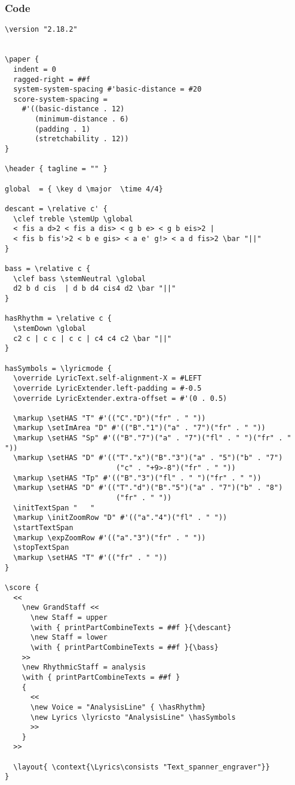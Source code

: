 \documentclass[
  DIV=calc,
  BCOR=5mm,
  12pt,
  headings=small,
  oneside,
  abstract=true,
  toc=bib,
  xcolor=dvipsnames,
  openany,
  ngerman,english]{scrartcl}
\begin{document}
\subsubsection{Code}
\begin{scriptsize}
\begin{verbatim}
\version "2.18.2"


\paper {
  indent = 0
  ragged-right = ##f
  system-system-spacing #'basic-distance = #20
  score-system-spacing =
    #'((basic-distance . 12)
       (minimum-distance . 6)
       (padding . 1)
       (stretchability . 12))
}

\header { tagline = "" }

global  = { \key d \major  \time 4/4}

descant = \relative c' {
  \clef treble \stemUp \global
  < fis a d>2 < fis a dis> < g b e> < g b eis>2 | 
  < fis b fis'>2 < b e gis> < a e' g!> < a d fis>2 \bar "||"
}

bass = \relative c {
  \clef bass \stemNeutral \global
  d2 b d cis  | d b d4 cis4 d2 \bar "||"
}

hasRhythm = \relative c {
  \stemDown \global
  c2 c | c c | c c | c4 c4 c2 \bar "||"
}

hasSymbols = \lyricmode {
  \override LyricText.self-alignment-X = #LEFT
  \override LyricExtender.left-padding = #-0.5
  \override LyricExtender.extra-offset = #'(0 . 0.5)

  \markup \setHAS "T" #'(("C"."D")("fr" . " "))
  \markup \setImArea "D" #'(("B"."1")("a" . "7")("fr" . " "))
  \markup \setHAS "Sp" #'(("B"."7")("a" . "7")("fl" . " ")("fr" . " "))
  \markup \setHAS "D" #'(("T"."x")("B"."3")("a" . "5")("b" . "7")
                          ("c" . "+9>-8")("fr" . " "))
  \markup \setHAS "Tp" #'(("B"."3")("fl" . " ")("fr" . " ")) 
  \markup \setHAS "D" #'(("T"."d")("B"."5")("a" . "7")("b" . "8")
                          ("fr" . " "))    
  \initTextSpan "   "
  \markup \initZoomRow "D" #'(("a"."4")("fl" . " "))
  \startTextSpan
  \markup \expZoomRow #'(("a"."3")("fr" . " ")) 
  \stopTextSpan
  \markup \setHAS "T" #'(("fr" . " "))
}

\score {
  <<
    \new GrandStaff <<
      \new Staff = upper
      \with { printPartCombineTexts = ##f }{\descant}
      \new Staff = lower
      \with { printPartCombineTexts = ##f }{\bass}
    >>
    \new RhythmicStaff = analysis
    \with { printPartCombineTexts = ##f }
    {
      << 
      \new Voice = "AnalysisLine" { \hasRhythm}
      \new Lyrics \lyricsto "AnalysisLine" \hasSymbols
      >>
    }
  >>

  \layout{ \context{\Lyrics\consists "Text_spanner_engraver"}}
} 

\end{verbatim}
\end{scriptsize}
\end{document}
